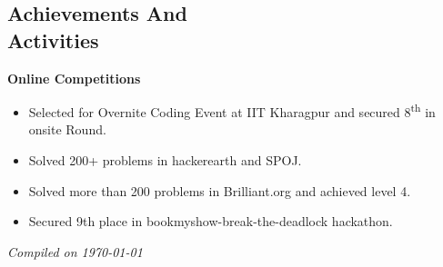 \documentclass[margin,line]{resume}
\begin{document}
\begin{resume}
    \section{\mysidestyle Achievements And \\ Activities}
	\vspace{0mm}
	    \textbf{Online Competitions}
	   	\vspace{0mm}
    \begin{itemize}
	        \item Selected for Overnite Coding Event at IIT Kharagpur and secured 8​\textsuperscript{th}​ in onsite Round.
	        \item Solved 200+ problems in hackerearth and SPOJ.
	        \item Solved more than 200 problems in Brilliant.org and achieved level 4.
	        \item Secured 9th place in bookmyshow-break-the-deadlock hackathon.
	        
   \end{itemize}
\hfill \textsl{Compiled on \monthyeardate\today}

\end{resume}
\end{document}
